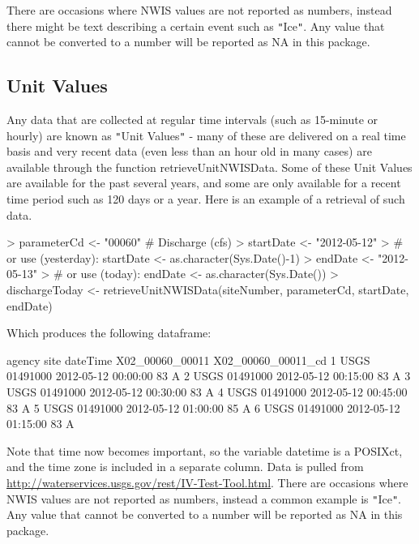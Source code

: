 \documentclass[a4paper,11pt]{article}
\begin{document}
There are occasions where NWIS values are not reported as numbers, instead there might be text describing a certain event such as \texttt{"}Ice\texttt{"}.  Any value that cannot be converted to a number will be reported as NA in this package.

\FloatBarrier
\subsection{Unit Values}
\label{sec:usgsRT}
Any data that are collected at regular time intervals (such as 15-minute or hourly) are known as \texttt{"}Unit Values\texttt{"} - many of these are delivered on a real time basis and very recent data (even less than an hour old in many cases) are available through the function retrieveUnitNWISData.  Some of these Unit Values are available for the past several years, and some are only available for a recent time period such as 120 days or a year.  Here is an example of a retrieval of such data.  

\begin{Schunk}
\begin{Sinput}
> parameterCd <- "00060"  # Discharge (cfs)
> startDate <- "2012-05-12" 
> # or use (yesterday): startDate <- as.character(Sys.Date()-1)
> endDate <- "2012-05-13" 
> # or use (today):  endDate <- as.character(Sys.Date())
> dischargeToday <- retrieveUnitNWISData(siteNumber, parameterCd, 
         startDate, endDate)
\end{Sinput}
\end{Schunk}
Which produces the following dataframe:
\begin{Schunk}
\begin{Soutput}
  agency     site            dateTime X02_00060_00011 X02_00060_00011_cd
1   USGS 01491000 2012-05-12 00:00:00              83                  A
2   USGS 01491000 2012-05-12 00:15:00              83                  A
3   USGS 01491000 2012-05-12 00:30:00              83                  A
4   USGS 01491000 2012-05-12 00:45:00              83                  A
5   USGS 01491000 2012-05-12 01:00:00              85                  A
6   USGS 01491000 2012-05-12 01:15:00              83                  A
\end{Soutput}
\end{Schunk}

Note that time now becomes important, so the variable datetime is a POSIXct, and the time zone is included in a separate column. Data is pulled from \url{http://waterservices.usgs.gov/rest/IV-Test-Tool.html}. There are occasions where NWIS values are not reported as numbers, instead a common example is \texttt{"}Ice\texttt{"}.  Any value that cannot be converted to a number will be reported as NA in this package.
\end{document}
